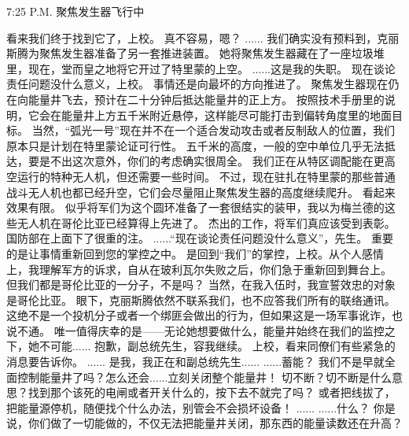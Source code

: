 \documentclass[openany]{book}
\begin{document}
7:25 P.M. 聚焦发生器飞行中
\begin{dialogue}
     看来我们终于找到它了，上校。
     真不容易，嗯？
     ......
     我们确实没有预料到，克丽斯腾为聚焦发生器准备了另一套推进装置。
     她将聚焦发生器藏在了一座垃圾堆里，现在，堂而皇之地将它开过了特里蒙的上空。
     ......这是我的失职。
     现在谈论责任问题没什么意义，上校。
     事情还是向最坏的方向推进了。
     聚焦发生器现在仍在向能量井飞去，预计在二十分钟后抵达能量井的正上方。
     按照技术手册里的说明，它会在能量井上方五千米附近悬停，这样能尽可能打击到偏转角度里的地面目标。
     当然，“弧光一号”现在并不在一个适合发动攻击或者反制敌人的位置，我们原本只是计划在特里蒙论证可行性。
     五千米的高度，一般的空中单位几乎无法抵达，要是不出这次意外，你们的考虑确实很周全。
     我们正在从特区调配能在更高空运行的特种无人机，但还需要一些时间。
     不过，现在驻扎在特里蒙的那些普通战斗无人机也都已经升空，它们会尽量阻止聚焦发生器的高度继续爬升。
     看起来效果有限。
     似乎将军们为这个圆环准备了一套很结实的装甲，我以为梅兰德的这些无人机在哥伦比亚已经算得上先进了。
     杰出的工作，将军们真应该受到表彰。
     国防部在上面下了很重的注。
     ......“现在谈论责任问题没什么意义”，先生。
     重要的是让事情重新回到您的掌控之中。
     是回到“我们”的掌控，上校。从个人感情上，我理解军方的诉求，自从在玻利瓦尔失败之后，你们急于重新回到舞台上。
     但我们都是哥伦比亚的一分子，不是吗？
     当然，在我入伍时，我宣誓效忠的对象是哥伦比亚。
     眼下，克丽斯腾依然不联系我们，也不应答我们所有的联络通讯。
     这绝不是一个投机分子或者一个绑匪会做出的行为，但如果这是一场军事讹诈，也说不通。
     唯一值得庆幸的是——无论她想要做什么，能量井始终在我们的监控之下，她不可能......
     抱歉，副总统先生，容我继续。
     上校，看来同僚们有些紧急的消息要告诉你。
     ......
     是我，我正在和副总统先生......
     ......蓄能？
     我们不是早就全面控制能量井了吗？怎么还会......立刻关闭整个能量井！
     切不断？切不断是什么意思？找到那个该死的电闸或者开关什么的，按下去不就完了吗？
     或者把线拔了，把能量源停机，随便找个什么办法，别管会不会损坏设备！
     ......
     ......什么？
     你是说，你们做了一切能做的，不仅无法把能量井关闭，那东西的能量读数还在升高？

\end{dialogue}
\end{document}
